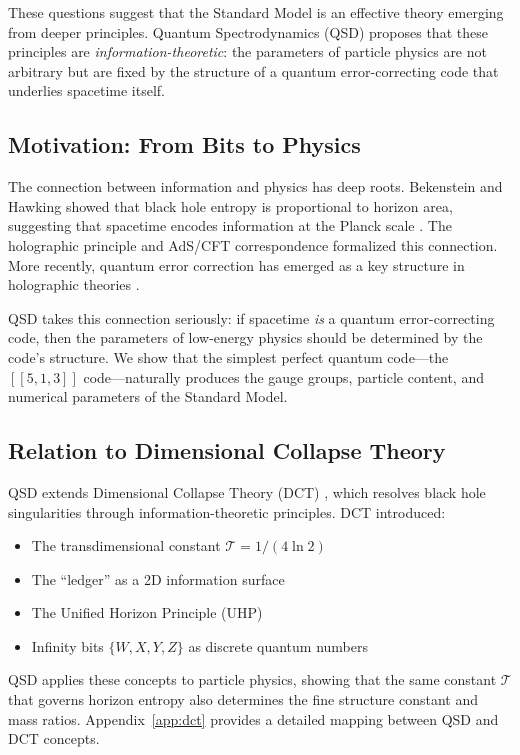 \documentclass[11pt,a4paper]{article}
\theoremstyle{definition}
\newcommand{\Tc}{\mathcal{T}}           %
\begin{document}
These questions suggest that the Standard Model is an effective theory emerging from deeper principles. Quantum Spectrodynamics (QSD) proposes that these principles are \emph{information-theoretic}: the parameters of particle physics are not arbitrary but are fixed by the structure of a quantum error-correcting code that underlies spacetime itself.

\subsection{Motivation: From Bits to Physics}

The connection between information and physics has deep roots. Bekenstein and Hawking showed that black hole entropy is proportional to horizon area, suggesting that spacetime encodes information at the Planck scale \cite{Bekenstein1973,Hawking1975}. The holographic principle \cite{tHooft1993,Susskind1995} and AdS/CFT correspondence \cite{Maldacena1999} formalized this connection. More recently, quantum error correction has emerged as a key structure in holographic theories \cite{Almheiri2015,Pastawski2015}.

QSD takes this connection seriously: if spacetime \emph{is} a quantum error-correcting code, then the parameters of low-energy physics should be determined by the code's structure. We show that the simplest perfect quantum code---the $[[5,1,3]]$ code---naturally produces the gauge groups, particle content, and numerical parameters of the Standard Model.

\subsection{Relation to Dimensional Collapse Theory}

QSD extends Dimensional Collapse Theory (DCT) \cite{Hubka2025DCT}, which resolves black hole singularities through information-theoretic principles. DCT introduced:
\begin{itemize}[nosep]
    \item The transdimensional constant $\Tc = 1/(4\ln 2)$
    \item The ``ledger'' as a 2D information surface
    \item The Unified Horizon Principle (UHP)
    \item Infinity bits $\{W, X, Y, Z\}$ as discrete quantum numbers
\end{itemize}

QSD applies these concepts to particle physics, showing that the same constant $\Tc$ that governs horizon entropy also determines the fine structure constant and mass ratios. Appendix~\ref{app:dct} provides a detailed mapping between QSD and DCT concepts.
\end{document}
